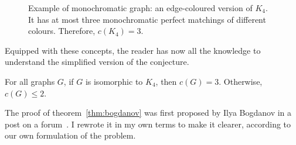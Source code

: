 \begin{figure}[H]
    \caption{Example of monochromatic graph: an edge-coloured version of $K_4$. It has at most three monochromatic perfect matchings of different colours.
        Therefore, $c(K_4) = 3$.}
    \label{fig:k4_pm}
\end{figure}

Equipped with these concepts, the reader has now all the knowledge to understand the simplified version of the conjecture.

\begin{theorem}
    \label{thm:bogdanov}
    For all graphs $G$, if $G$ is isomorphic to $K_4$, then $c(G) = 3$.
    Otherwise, $c(G) \leq 2$.
\end{theorem}

The proof of theorem~\ref{thm:bogdanov} was first proposed by Ilya Bogdanov in a post on a forum~\cite{bogdanov}.
I rewrote it in my own terms to make it clearer, according to our own formulation of the problem.

